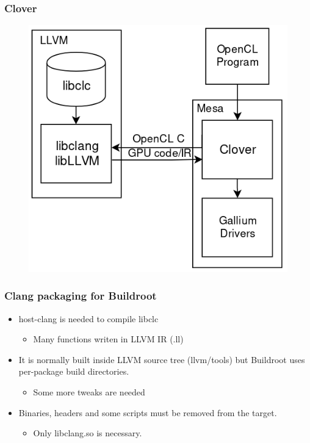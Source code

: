 \documentclass{smilebeamer}
\begin{document}
\begin{frame}
\frametitle{Clover}
\begin{figure}
\includegraphics[width=0.7\linewidth]{img/clover.png}
\end{figure}
\end{frame}


\begin{frame}
\frametitle{Clang packaging for Buildroot}
\begin{itemize}
  \item host-clang is needed to compile libclc
  \begin{itemize}
    \item Many functions writen in LLVM IR (.ll)
  \end{itemize}
  \item It is normally built inside LLVM source tree (llvm/tools) but Buildroot
  uses per-package build directories.
  \begin{itemize}
    \item Some more tweaks are needed
  \end{itemize}
  \item Binaries, headers and some scripts must be removed from the target.
  \begin{itemize}
    \item Only libclang.so is necessary.
  \end{itemize}
\end{itemize}
\end{frame}
\end{document}
